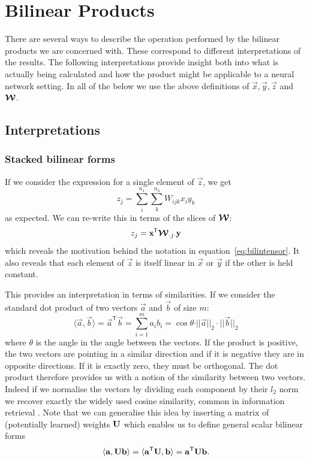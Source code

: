 \section{Bilinear Products}
There are several ways to describe the operation performed by the bilinear products we are
concerned with. These correspond to different interpretations of the results. The following
interpretations provide insight both into what is actually being calculated and how the product might
be applicable to a neural network setting. In all of the below we use the above definitions of
\(\vec{x}, \vec{y}, \vec{z}\) and \(\bm{\mathcal{W}}\).

\subsection{Interpretations}
\subsubsection{Stacked bilinear forms}
If we consider the expression for a single element of \(\vec{z}\), we get
\begin{equation} \label{eq:singlezsum}
	z_j = \sum_i^{n_1} \sum_k^{n_3} W_{ijk} x_i y_k
\end{equation} as expected. We can re-write this in terms of the slices of \(\bm{\mathcal{W}}\):
\begin{equation}\label{eq:singlezslice}
	z_j = \mathbf{x}^{\mkern-1.5mu\mathsf{T}}\bm{\mathcal{W}}_{\cdot j \cdot}\mathbf{y}
\end{equation} which reveals the motivation behind the notation in equation~\eqref{eq:bilintensor}.
It also reveals that each element of \(\vec{z}\) is itself linear in \(\vec{x}\) or \(\vec{y}\) if
the other is held constant.

This provides an interpretation
in terms of similarities. If we consider the standard dot product of two vectors 
\(\vec{a}\) and
\(\vec{b}\) of size \(m\): 
\begin{equation}
\langle\vec{a}, \vec{b}\rangle = 
\vec{a}^\mathsf{T}\vec{b}
= \sum_{i=1}^ma_ib_i
 = {\cos\theta}{\cdot||\vec{a}||_2\cdot||\vec{b}||_2} 
\end{equation} where
\(\theta\) is the angle in the angle between the vectors. If the product
is positive, the two vectors are pointing in a similar direction and if it is negative they
are in opposite directions. If it is exactly zero, they must be orthogonal. The dot product
therefore provides us with a notion of the similarity between two vectors.
Indeed if we normalise the vectors by dividing each component by their \(l_2\) norm we
recover exactly the widely used cosine similarity, common in information retrieval 
\autocite{Singhal2001, Tan2006} . Note that
we can generalise this idea by inserting a matrix of (potentially learned)
weights \(\mathbf{U}\) which enables us
to define general scalar bilinear forms
\begin{equation}
	\langle\mathbf{a}, \mathbf{U}\mathbf{b}\rangle = \langle\mathbf{a}^\mathsf{T}\mathbf{U}, \mathbf{b}\rangle
	= \mathbf{a}^\mathsf{T}\mathbf{U}\mathbf{b}.
\end{equation}

